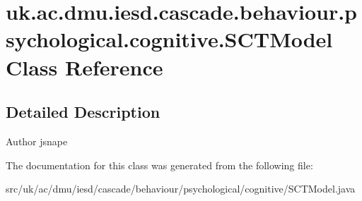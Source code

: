 \hypertarget{classuk_1_1ac_1_1dmu_1_1iesd_1_1cascade_1_1behaviour_1_1psychological_1_1cognitive_1_1_s_c_t_model}{\section{uk.\-ac.\-dmu.\-iesd.\-cascade.\-behaviour.\-psychological.\-cognitive.\-S\-C\-T\-Model Class Reference}
\label{classuk_1_1ac_1_1dmu_1_1iesd_1_1cascade_1_1behaviour_1_1psychological_1_1cognitive_1_1_s_c_t_model}
}


\subsection{Detailed Description}
\begin{DoxyAuthor}{Author}
jsnape 
\end{DoxyAuthor}


The documentation for this class was generated from the following file\-:\begin{DoxyCompactItemize}
\item 
src/uk/ac/dmu/iesd/cascade/behaviour/psychological/cognitive/S\-C\-T\-Model.\-java\end{DoxyCompactItemize}
